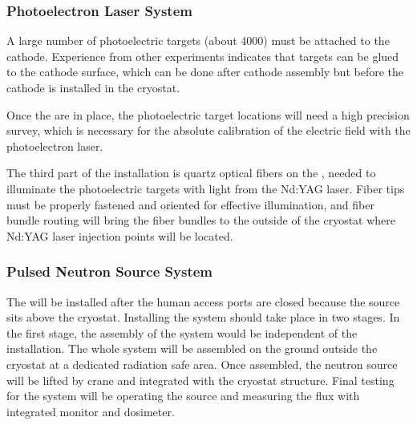 \subsubsection{Photoelectron Laser System} 
A large number of photoelectric targets (about \num{4000}) must be %
attached to the cathode. Experience from other experiments indicates that targets can be glued to the cathode surface, which can be done after cathode assembly but before the cathode is installed in the cryostat. 

Once the  are in place, the photoelectric target locations will need a high precision survey, which is necessary for the absolute calibration of the electric field with the photoelectron laser. 

The third part of the installation is  quartz optical fibers on the , needed to illuminate  the photoelectric targets with light from the Nd:YAG laser. %
Fiber tips must be properly fastened and oriented for effective illumination, and fiber bundle routing will bring the fiber bundles to the outside of the cryostat where Nd:YAG laser injection points will be located. 

\subsubsection{Pulsed Neutron Source System} 
The  will be installed after the human access ports are closed because the source sits above the cryostat. Installing the system should take place in two stages. In the first stage, the assembly of the system would be independent of the  installation. The whole system will be %
assembled on the ground outside the cryostat at a dedicated radiation safe area. Once assembled, the neutron source will be lifted by crane and integrated with the cryostat structure. Final  testing for the system will be operating the source and measuring the flux with integrated monitor and dosimeter.


